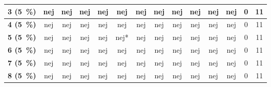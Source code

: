 \begin{longtable} {|l|c|c|c|c|c|c|c|c|c|c|c|c|c|}
\cellcolor[HTML]{C0C0C0}\textbf{3   (5~\%)}	 & \cellcolor[HTML]{ECF4FF} nej	& \cellcolor[HTML]{ECF4FF}nej &	\cellcolor[HTML]{ECF4FF}nej &\cellcolor[HTML]{ECF4FF} nej	& \cellcolor[HTML]{ECF4FF}nej &	\cellcolor[HTML]{ECF4FF}nej	& \cellcolor[HTML]{ECF4FF}nej & \cellcolor[HTML]{ECF4FF}nej	& \cellcolor[HTML]{ECF4FF}nej	& \cellcolor[HTML]{ECF4FF}nej	& \cellcolor[HTML]{ECF4FF}nej & \cellcolor[HTML]{EFEFEF}0 & \cellcolor[HTML]{EFEFEF}11\\ \hline 
\cellcolor[HTML]{C0C0C0}\textbf{4    (5~\%)}	 & \cellcolor[HTML]{ECF4FF} nej	& \cellcolor[HTML]{ECF4FF}nej &	\cellcolor[HTML]{ECF4FF}nej &\cellcolor[HTML]{ECF4FF} nej	& \cellcolor[HTML]{ECF4FF}nej &	\cellcolor[HTML]{ECF4FF}nej	& \cellcolor[HTML]{ECF4FF}nej & \cellcolor[HTML]{ECF4FF}nej	& \cellcolor[HTML]{ECF4FF}nej	& \cellcolor[HTML]{ECF4FF}nej	& \cellcolor[HTML]{ECF4FF}nej & \cellcolor[HTML]{EFEFEF}0 & \cellcolor[HTML]{EFEFEF}11\\ \hline 
\cellcolor[HTML]{C0C0C0}\textbf{5    (5~\%)}	 & \cellcolor[HTML]{ECF4FF} nej	& \cellcolor[HTML]{ECF4FF}nej &	\cellcolor[HTML]{ECF4FF}nej &\cellcolor[HTML]{ECF4FF} nej	& \cellcolor[HTML]{ECF4FF}nej* &	\cellcolor[HTML]{ECF4FF}nej	& \cellcolor[HTML]{ECF4FF}nej & \cellcolor[HTML]{ECF4FF}nej	& \cellcolor[HTML]{ECF4FF}nej	& \cellcolor[HTML]{ECF4FF}nej	& \cellcolor[HTML]{ECF4FF}nej & \cellcolor[HTML]{EFEFEF}0 & \cellcolor[HTML]{EFEFEF}11\\ \hline 
\cellcolor[HTML]{C0C0C0}\textbf{6    (5~\%)}	 & \cellcolor[HTML]{ECF4FF} nej	& \cellcolor[HTML]{ECF4FF}nej &	\cellcolor[HTML]{ECF4FF}nej &\cellcolor[HTML]{ECF4FF} nej	& \cellcolor[HTML]{ECF4FF}nej &	\cellcolor[HTML]{ECF4FF}nej	& \cellcolor[HTML]{ECF4FF}nej & \cellcolor[HTML]{ECF4FF}nej	& \cellcolor[HTML]{ECF4FF}nej	& \cellcolor[HTML]{ECF4FF}nej	& \cellcolor[HTML]{ECF4FF}nej & \cellcolor[HTML]{EFEFEF}0 & \cellcolor[HTML]{EFEFEF}11\\ \hline 
\cellcolor[HTML]{C0C0C0}\textbf{7    (5~\%)}	 & \cellcolor[HTML]{ECF4FF} nej	& \cellcolor[HTML]{ECF4FF}nej &	\cellcolor[HTML]{ECF4FF}nej &\cellcolor[HTML]{ECF4FF} nej	& \cellcolor[HTML]{ECF4FF}nej &	\cellcolor[HTML]{ECF4FF}nej	& \cellcolor[HTML]{ECF4FF}nej & \cellcolor[HTML]{ECF4FF}nej	& \cellcolor[HTML]{ECF4FF}nej	& \cellcolor[HTML]{ECF4FF}nej	& \cellcolor[HTML]{ECF4FF}nej & \cellcolor[HTML]{EFEFEF}0 & \cellcolor[HTML]{EFEFEF}11\\ \hline 
\cellcolor[HTML]{C0C0C0}\textbf{8    (5~\%)}	 & \cellcolor[HTML]{ECF4FF} nej	& \cellcolor[HTML]{ECF4FF}nej &	\cellcolor[HTML]{ECF4FF}nej &\cellcolor[HTML]{ECF4FF} nej	& \cellcolor[HTML]{ECF4FF}nej &	\cellcolor[HTML]{ECF4FF}nej	& \cellcolor[HTML]{ECF4FF}nej & \cellcolor[HTML]{ECF4FF}nej	& \cellcolor[HTML]{ECF4FF}nej	& \cellcolor[HTML]{ECF4FF}nej	& \cellcolor[HTML]{ECF4FF}nej & \cellcolor[HTML]{EFEFEF}0 & \cellcolor[HTML]{EFEFEF}11\\ \hline 

\end{longtable}

